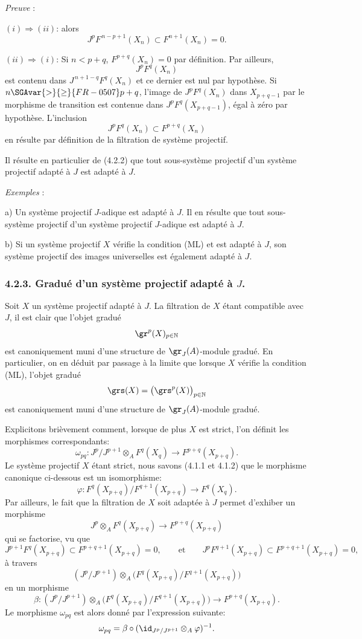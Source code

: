 \emph{Preuve} :

\((i)\Rightarrow(ii)\): alors
\[
J^pF^{\,n-p+1}(X_n)\subset F^{n+1}(X_n)=0.
\]

\((ii)\Rightarrow(i)\): Si \(n<p+q\), \(F^{p+q}(X_n)=0\) par définition. Par
ailleurs,
\[
J^pF^q(X_n)
\]
est contenu dans \(J^{\,n+1-q}F^q(X_n)\) et ce dernier est nul par hypothèse. Si \(n\SGAvar{>}{\ge }{FR-0507}p+q\), l'image de \(J^pF^q(X_n)\) dans \(X_{p+q-1}\) par le morphisme de transition est contenue dans \(J^pF^q(X_{p+q-1})\), égal à zéro par hypothèse. L'inclusion
\[
J^pF^q(X_n)\subset F^{p+q}(X_n)
\]
en résulte par définition de la filtration de système projectif.

Il résulte en particulier de (4.2.2) que tout sous-système projectif d'un système projectif adapté à \(J\) est adapté à \(J\).

\emph{Exemples} :

a) Un système projectif \(J\)-adique est adapté à \(J\). Il en résulte que tout sous-système projectif d'un système projectif \(J\)-adique est adapté à \(J\).

b) Si un système projectif \(X\) vérifie la condition (ML) et est adapté à \(J\), son système projectif des images universelles est également adapté à \(J\).

\subsubsection*{4.2.3. Gradué d'un système projectif adapté à \(J\).}
Soit \(X\) un système projectif adapté à \(J\). La filtration de \(X\) étant compatible avec \(J\), il est clair que l'objet gradué
\[
\gr^p(X)_{p\in\mathbb{N}}
\]
est canoniquement muni d'une structure de \(\gr_J(A)\)-module gradué. En particulier, on en déduit par passage à la limite que lorsque \(X\) vérifie la condition (ML), l'objet gradué
\[
\grs(X)=\bigl(\grs^p(X)\bigr)_{p\in\mathbb{N}}
\]
est canoniquement muni d'une structure de \(\gr_J(A)\)-module gradué.

Explicitons brièvement comment, lorsque de plus \(X\) est strict, l'on définit les morphismes correspondants:
\[
\omega_{pq}: J^p/J^{p+1}\otimes_A F^q(X_q)\longrightarrow F^{p+q}(X_{p+q}).
\]
Le
système projectif \(X\) étant strict, nous savons (4.1.1 et 4.1.2) que le morphisme canonique ci-dessous est un isomorphisme:
\[
\varphi:F^q(X_{p+q})/F^{q+1}(X_{p+q})\longrightarrow F^q(X_q).
\]
Par ailleurs, le fait que la filtration de \(X\) soit adaptée à \(J\) permet d'exhiber un morphisme
\[
J^p\otimes_A F^q(X_{p+q})\longrightarrow F^{p+q}(X_{p+q})
\]
qui se factorise, vu que
\[
J^{p+1}F^q(X_{p+q})\subset F^{p+q+1}(X_{p+q})=0,\qquad\text{et}\qquad
J^pF^{q+1}(X_{p+q})\subset F^{p+q+1}(X_{p+q})=0,
\]
à travers
\[
(J^p/J^{p+1})\otimes_A
\bigl(F^q(X_{p+q})/F^{q+1}(X_{p+q})\bigr)
\]
en un morphisme
\[
\beta:(J^p/J^{p+1})\otimes_A
\bigl(F^q(X_{p+q})/F^{q+1}(X_{p+q})\bigr)
\longrightarrow F^{p+q}(X_{p+q}).
\]
Le morphisme \(\omega_{pq}\) est alors donné par l'expression suivante:
\[
\omega_{pq}=\beta\circ(\id_{J^p/J^{p+1}}\otimes_A\varphi)^{-1}.
\]

